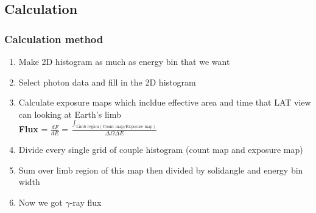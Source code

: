 \documentclass{beamer}
\begin{document}
\subsection{Calculation}
\begin{frame}
\frametitle{Calculation method}
\begin{enumerate}
  \item Make 2D histogram as much as energy bin that we want
  \item Select photon data and fill in the 2D histogram
  \item Calculate exposure maps which incldue effective area
  and time that LAT view can looking at Earth's limb
  \\ \textbf{Flux} = $\frac{dF}{dE} = \frac{\int_{\text{Limb region}(\text{Count map}/\text{Exposure map})}}{\Delta\Omega\Delta E }$
  \item Divide every single grid of couple histogram (count map and exposure map)
  \item Sum over limb region of this map then divided by solidangle and energy bin width
  \item Now we got $\gamma$-ray flux
\end{enumerate}
\end{frame}





\end{document}
